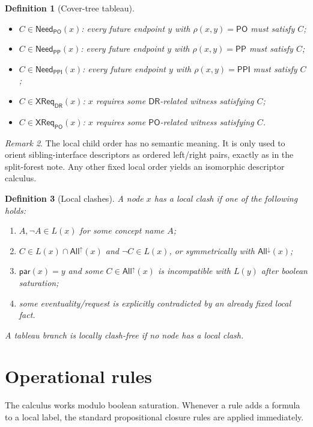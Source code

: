 \documentclass[11pt]{article}
\newtheorem{definition}{Definition}[section]
\theoremstyle{remark}
\newtheorem{remark}[definition]{Remark}
\newcommand{\DR}{\mathsf{DR}}
\newcommand{\PO}{\mathsf{PO}}
\newcommand{\PP}{\mathsf{PP}}
\newcommand{\PPI}{\mathsf{PPI}}
\newcommand{\AllUp}{\mathsf{All}^{\uparrow}}
\newcommand{\AllDown}{\mathsf{All}^{\downarrow}}
\newcommand{\CrossDR}{\mathsf{XReq}_{\DR}}
\newcommand{\CrossPO}{\mathsf{XReq}_{\PO}}
\newcommand{\NeedPO}{\mathsf{Need}_{\PO}}
\newcommand{\NeedPP}{\mathsf{Need}_{\PP}}
\newcommand{\NeedPPI}{\mathsf{Need}_{\PPI}}
\begin{document}
\begin{definition}[Cover-tree tableau]
\begin{itemize}
    \item $C\in \NeedPO(x)$: every future endpoint $y$ with $\rho(x,y)=\PO$ must satisfy $C$;
    \item $C\in \NeedPP(x)$: every future endpoint $y$ with $\rho(x,y)=\PP$ must satisfy $C$;
    \item $C\in \NeedPPI(x)$: every future endpoint $y$ with $\rho(x,y)=\PPI$ must satisfy $C$;
    \item $C\in \CrossDR(x)$: $x$ requires some $\DR$-related witness satisfying $C$;
    \item $C\in \CrossPO(x)$: $x$ requires some $\PO$-related witness satisfying $C$.
\end{itemize}
\end{definition}

\begin{remark}
The local child order has no semantic meaning. It is only used to orient sibling-interface descriptors as ordered left/right pairs, exactly as in the split-forest note. Any other fixed local order yields an isomorphic descriptor calculus.
\end{remark}

\begin{definition}[Local clashes]\label{def:local-clash}
A node $x$ has a \emph{local clash} if one of the following holds:
\begin{enumerate}[label=(\alph*)]
    \item $A,\neg A\in L(x)$ for some concept name $A$;
    \item $C\in L(x)\cap \AllUp(x)$ and $\neg C\in L(x)$, or symmetrically with $\AllDown(x)$;
    \item $\mathsf{par}(x)=y$ and some $C\in \AllUp(x)$ is incompatible with $L(y)$ after boolean saturation;
    \item some eventuality/request is explicitly contradicted by an already fixed local fact.
\end{enumerate}
A tableau branch is \emph{locally clash-free} if no node has a local clash.
\end{definition}

\section{Operational rules}

The calculus works modulo boolean saturation. Whenever a rule adds a formula to a local label, the standard propositional closure rules are applied immediately.
\end{document}
